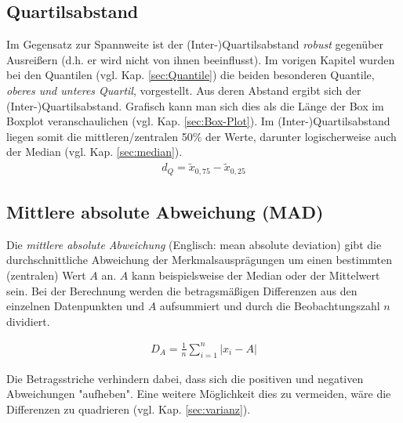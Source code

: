\documentclass[a4paper]{article}
\begin{document}
\noindent {}

\subsection{Quartilsabstand}
Im Gegensatz zur Spannweite ist der (Inter-)Quartilsabstand \textit{robust} gegenüber Ausreißern (d.h. er wird nicht von ihnen beeinflusst). Im vorigen Kapitel wurden bei den Quantilen (vgl. Kap. \ref{sec:Quantile}) die beiden besonderen Quantile, \textit{oberes und unteres Quartil}, vorgestellt. Aus deren Abstand ergibt sich der (Inter-)Quartilsabstand. Grafisch kann man sich dies als die Länge der Box im Boxplot veranschaulichen (vgl. Kap. \ref{sec:Box-Plot}).
Im (Inter-)Quartilsabstand liegen somit die mittleren/zentralen 50\% der Werte, darunter logischerweise auch der Median (vgl. Kap. \ref{sec:median}).
\begin{align*}
    d_Q = \tilde{x}_{0,75}-\tilde{x}_{0,25}
\end{align*}

\noindent {}

\subsection{Mittlere absolute Abweichung (MAD)}
Die \textit{mittlere absolute Abweichung} (Englisch: mean absolute deviation) gibt die durchschnittliche Abweichung der Merkmalsausprägungen um einen bestimmten (zentralen) Wert $A$ an. $A$ kann beispielsweise der Median oder der Mittelwert sein. Bei der Berechnung werden die betragsmäßigen Differenzen aus den einzelnen Datenpunkten und $A$ aufsummiert und durch die Beobachtungszahl $n$ dividiert.

\begin{align*}
    D_A = \frac{1}{n} \sum_{i=1}^n |x_i-A| 
\end{align*}

\noindent Die Betragsstriche verhindern dabei, dass sich die positiven und negativen Abweichungen "aufheben". Eine weitere Möglichkeit dies zu vermeiden, wäre die Differenzen zu quadrieren (vgl. Kap. \ref{sec:varianz}).\\
\end{document}
